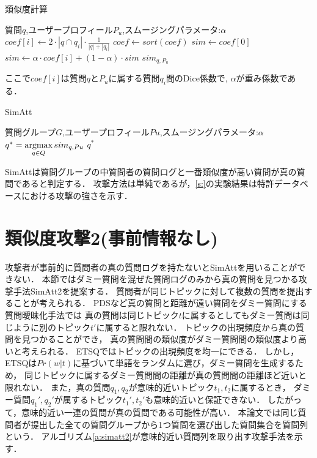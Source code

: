 \documentclass[master]{suribt}
\theoremstyle{definition}
\newcommand{\argmax}{\mathop{\rm argmax}\limits}
\begin{document}
 \begin{algorithm}
 \caption{類似度計算}
 \begin{algorithmic}[1]
  \Require 質問$q$,ユーザープロフィール$P_u$,スムージングパラメータ:$\alpha$
  \State $coef[i] \leftarrow 2 \cdot |q \cap q_i| \cdot \frac{1}{|q|+|q_i|}$
  \EndFor
  \State $coef \gets sort(coef)$
  \State $sim \gets coef[0]$
  \State $sim \gets \alpha \cdot coef[i] + (1 - \alpha) \cdot sim$
  \EndFor
  \Ensure $sim_{q,P_u}$
 \end{algorithmic}
 \label{a:simatt}
 \end{algorithm}

 ここで$coef[i]$は質問$q$と$P_u$に属する質問$q_i$間のDice係数\cite{}で,
 $\alpha$が重み係数である．
  
 \begin{algorithm}
 \caption{SimAtt}
 \begin{algorithmic}[1]
   \Require 質問グループ$G$,ユーザープロフィール$Pu$,スムージングパラメータ:$\alpha$
   \State $q^* = \argmax_{q \in Q}sim_{q,Pu}$
   \Ensure $q^*$
 \end{algorithmic}
 \end{algorithm}

 SimAttは質問グループの中質問者の質問ログと一番類似度が高い質問が真の質問であると判定する．
 攻撃方法は単純であるが，\ref{s:}の実験結果は特許データベースにおける攻撃の強さを示す．

 \section{類似度攻撃2(事前情報なし)}
 攻撃者が事前的に質問者の真の質問ログを持たないとSimAttを用いることができない．
 本節ではダミー質問を混ぜた質問ログのみから真の質問を見つかる攻撃手法SimAtt2を提案する．
 質問者が同じトピックに対して複数の質問を提出することが考えられる．
 PDSなど真の質問と距離が遠い質問をダミー質問にする質問曖昧化手法では
 真の質問は同じトピック$t$に属するとしてもダミー質問は同じように別のトピック$t'$に属すると限れない．
 トピックの出現頻度から真の質問を見つかることができ，
 真の質問間の類似度がダミー質問間の類似度より高いと考えられる．
 ETSQではトピックの出現頻度を均一にできる．
 しかし，ETSQは$Pr(w|t)$に基づいて単語をランダムに選び，ダミー質問を生成するため，
 同じトピックに属するダミー質問間の距離が真の質問間の距離ほど近いと限れない．
 また，真の質問$q_1,q_2$が意味的近いトピック$t_1,t_2$に属するとき，
 ダミー質問$q_1',q_2'$が属するトピック$t_1',t_2'$も意味的近いと保証できない．
 したがって，意味的近い一連の質問が真の質問である可能性が高い．
 本論文では同じ質問者が提出した全ての質問グループから1つ質問を選び出した質問集合を質問列という．
 アルゴリズム\ref{a:simatt2}が意味的近い質問列を取り出す攻撃手法を示す．
\end{document}
